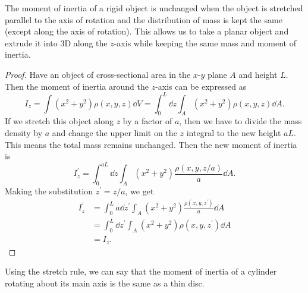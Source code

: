 \documentclass[../classical_mechanics.tex]{subfiles}
\begin{document}
        \begin{theorem}
            The moment of inertia of a rigid object is unchanged when the object is stretched parallel to the axis of rotation and the distribution of mass is kept the same (except along the axis of rotation).
            This allows us to take a planar object and extrude it into 3D along the $z$-axis while keeping the same mass and moment of inertia.
        \end{theorem}
        \begin{proof}
            Have an object of cross-sectional area in the $x$-$y$ plane $A$ and height $L$.
            Then the moment of inertia around the $z$-axis can be expressed as
            \begin{equation}
                I_z=\int(x^2+y^2)\rho(x,y,z)\dd{V}=\int_0^L\dd{z}\int_A(x^2+y^2)\rho(x,y,z)\dd{A}.
            \end{equation}
            If we stretch this object along $z$ by a factor of $a$, then we have to divide the mass density by $a$ and change the upper limit on the $z$ integral to the new height $aL$.
            This means the total mass remains unchanged.
            Then the new moment of inertia is
            \begin{equation}
                I_z^\prime=\int_0^{aL}\dd{z}\int_A(x^2+y^2)\frac{\rho(x,y,z/a)}{a}\dd{A}.
            \end{equation}
            Making the substitution $z^\prime=z/a$, we get
            \begin{align}
                I_z^\prime&=\int_0^L a\dd{z}^\prime\int_A(x^2+y^2)\frac{\rho(x,y,z^\prime)}{a}\dd{A}\\
                &=\int_0^L\dd{z}^\prime\int_A(x^2+y^2)\rho(x,y,z^\prime)\dd{A}\\
                &=I_z.
            \end{align}
        \end{proof}
        Using the stretch rule, we can say that the moment of inertia of a cylinder rotating about its main axis is the same as a thin disc.
\end{document}
